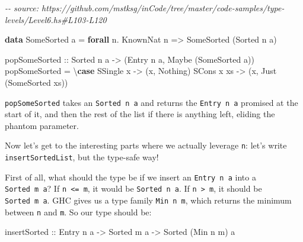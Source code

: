 \documentclass[]{article}
\newenvironment{Shaded}{}{}
\newcommand{\CommentTok}[1]{\textcolor[rgb]{0.38,0.63,0.69}{\textit{#1}}}
\newcommand{\DataTypeTok}[1]{\textcolor[rgb]{0.56,0.13,0.00}{#1}}
\newcommand{\KeywordTok}[1]{\textcolor[rgb]{0.00,0.44,0.13}{\textbf{#1}}}
\newcommand{\NormalTok}[1]{#1}
\newcommand{\OperatorTok}[1]{\textcolor[rgb]{0.40,0.40,0.40}{#1}}
\newcommand{\OtherTok}[1]{\textcolor[rgb]{0.00,0.44,0.13}{#1}}
\begin{document}
\begin{Shaded}
\begin{Highlighting}[]
\CommentTok{{-}{-} source: https://github.com/mstksg/inCode/tree/master/code{-}samples/type{-}levels/Level6.hs\#L103{-}L120}

\KeywordTok{data} \DataTypeTok{SomeSorted}\NormalTok{ a }\OtherTok{=} \KeywordTok{forall}\NormalTok{ n}\OperatorTok{.} \DataTypeTok{KnownNat}\NormalTok{ n }\OtherTok{=\textgreater{}} \DataTypeTok{SomeSorted}\NormalTok{ (}\DataTypeTok{Sorted}\NormalTok{ n a)}

\OtherTok{popSomeSorted ::} \DataTypeTok{Sorted}\NormalTok{ n a }\OtherTok{{-}\textgreater{}}\NormalTok{ (}\DataTypeTok{Entry}\NormalTok{ n a, }\DataTypeTok{Maybe}\NormalTok{ (}\DataTypeTok{SomeSorted}\NormalTok{ a))}
\NormalTok{popSomeSorted }\OtherTok{=}\NormalTok{ \textbackslash{}}\KeywordTok{case}
  \DataTypeTok{SSingle}\NormalTok{ x }\OtherTok{{-}\textgreater{}}\NormalTok{ (x, }\DataTypeTok{Nothing}\NormalTok{)}
  \DataTypeTok{SCons}\NormalTok{ x xs }\OtherTok{{-}\textgreater{}}\NormalTok{ (x, }\DataTypeTok{Just}\NormalTok{ (}\DataTypeTok{SomeSorted}\NormalTok{ xs))}
\end{Highlighting}
\end{Shaded}

\texttt{popSomeSorted} takes an \texttt{Sorted\ n\ a} and returns the
\texttt{Entry\ n\ a} promised at the start of it, and then the rest of the list
if there is anything left, eliding the phantom parameter.

Now let's get to the interesting parts where we actually leverage \texttt{n}:
let's write \texttt{insertSortedList}, but the type-safe way!

First of all, what should the type be if we insert an \texttt{Entry\ n\ a} into
a \texttt{Sorted\ m\ a}? If \texttt{n\ \textless{}=\ m}, it would be
\texttt{Sorted\ n\ a}. If \texttt{n\ \textgreater{}\ m}, it should be
\texttt{Sorted\ m\ a}. GHC gives us a type family \texttt{Min\ n\ m}, which
returns the minimum between \texttt{n} and \texttt{m}. So our type should be:

\begin{Shaded}
\begin{Highlighting}[]
\OtherTok{insertSorted ::} \DataTypeTok{Entry}\NormalTok{ n a }\OtherTok{{-}\textgreater{}} \DataTypeTok{Sorted}\NormalTok{ m a }\OtherTok{{-}\textgreater{}} \DataTypeTok{Sorted}\NormalTok{ (}\DataTypeTok{Min}\NormalTok{ n m) a}
\end{Highlighting}
\end{Shaded}
\end{document}
